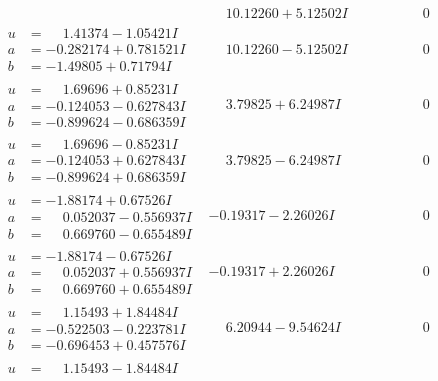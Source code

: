 \documentclass[1p]{elsarticle_modified}
\theoremstyle{definition}
\begin{document}
$$\begin{array}{c|c|c}
 & \phantom{-}10.12260 + 5.12502 I & \phantom{-0.000000 } 0 \\ \hline\begin{aligned}
u &= \phantom{-}1.41374 - 1.05421 I \\
a &= -0.282174 + 0.781521 I \\
b &= -1.49805 + 0.71794 I\end{aligned}
 & \phantom{-}10.12260 - 5.12502 I & \phantom{-0.000000 } 0 \\ \hline\begin{aligned}
u &= \phantom{-}1.69696 + 0.85231 I \\
a &= -0.124053 - 0.627843 I \\
b &= -0.899624 - 0.686359 I\end{aligned}
 & \phantom{-}3.79825 + 6.24987 I & \phantom{-0.000000 } 0 \\ \hline\begin{aligned}
u &= \phantom{-}1.69696 - 0.85231 I \\
a &= -0.124053 + 0.627843 I \\
b &= -0.899624 + 0.686359 I\end{aligned}
 & \phantom{-}3.79825 - 6.24987 I & \phantom{-0.000000 } 0 \\ \hline\begin{aligned}
u &= -1.88174 + 0.67526 I \\
a &= \phantom{-}0.052037 - 0.556937 I \\
b &= \phantom{-}0.669760 - 0.655489 I\end{aligned}
 & -0.19317 - 2.26026 I & \phantom{-0.000000 } 0 \\ \hline\begin{aligned}
u &= -1.88174 - 0.67526 I \\
a &= \phantom{-}0.052037 + 0.556937 I \\
b &= \phantom{-}0.669760 + 0.655489 I\end{aligned}
 & -0.19317 + 2.26026 I & \phantom{-0.000000 } 0 \\ \hline\begin{aligned}
u &= \phantom{-}1.15493 + 1.84484 I \\
a &= -0.522503 - 0.223781 I \\
b &= -0.696453 + 0.457576 I\end{aligned}
 & \phantom{-}6.20944 - 9.54624 I & \phantom{-0.000000 } 0 \\ \hline\begin{aligned}
u &= \phantom{-}1.15493 - 1.84484 I \\

\end{aligned}
\end{array}$$
\end{document}
